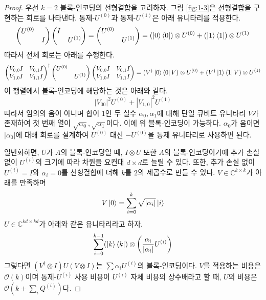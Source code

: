 \documentclass[a4paper,atbegshi,chapter,]{oblivoir}
\begin{document}
\begin{proof}
  우선 $k=2$ 블록-인코딩의 선형결합을 고려하자. 그림 \ref{fig:1-3}은 선형결합을
  구현하는 회로를 나타낸다. 통제-$U^{(0)}$과 통제-$U^{(1)}$은 아래 유니타리를
  적용한다.
  \begin{equation}
    \begin{pmatrix}U^{(0)}&\\&I\end{pmatrix}
    \begin{pmatrix}I&\\&U^{(1)}\end{pmatrix}=
    \begin{pmatrix}U^{(0)}&\\&U^{(1)}\end{pmatrix}=
    (\ket0\bra0)\otimes U^{(0)}+(\ket1\bra1)\otimes U^{(1)}
  \end{equation}
  따라서 전체 회로는 아래를 수행한다.
  \begin{equation}
    \begin{pmatrix}V_{0,0}I&V_{0,1}I\\V_{1,0}I&V_{1,1}I\end{pmatrix}^{\dagger}
    \begin{pmatrix}U^{(0)}&\\&U^{(1)}\end{pmatrix}
    \begin{pmatrix}V_{0,0}I&V_{0,1}I\\V_{1,0}I&V_{1,1}I\end{pmatrix}=
    (V^{\dagger}\ket0\bra0V)\otimes U^{(0)}+(V^{\dagger}\ket1\bra1V)\otimes
    U^{(1)}
  \end{equation}
  이 행렬에서 블록-인코딩에 해당하는 것은 아래와 같다.
  \begin{equation}
    |V_{00}|^2U^{(0)}+|V_{1,0}|^2 U^{(1)}
  \end{equation}
  따라서 임의의 음이 아니며 합이 $1$인 두 실수 $\alpha_0,\alpha_1$에 대해
  단일 큐비트 유니타리 $V$가 존재하여 첫 번째 열이 $\sqrt{\alpha_0},
  \sqrt{\alpha_1}$이다. 이에 위 블록-인코딩이 가능하다. $\alpha_0$가 음이면
  $|\alpha_0|$에 대해 회로를 설계하여 $U^{(0)}$ 대신 $-U^{(0)}$을 통제
  유니타리로 사용하면 된다.

  일반화하면, $U$가 $A$의 블록-인코딩일 때, $I\otimes U$ 또한 $A$의
  블록-인코딩이기에 추가 손실 없이 $U^{(i)}$의 크기에 따라 차원을 요컨대
  $d\times d$로 
  늘릴 수 있다. 또한, 추가 손실 없이 $U^{(i)}=I$와 $\alpha_i=0$를
  선형결합에 더해 $k$를 $2$의 제곱수로 만들 수 있다. 
  $V\in\mathbb{C}^{k\times k}$가 아래를 만족하며
  \[
    V\ket0 = \sum_{i=0}^k\sqrt{|\alpha_i|}\ket{i}
  \]
  $U\in\mathbb{C}^{kd\times kd}$가 아래와 같은 유니타리라고 하자.
  \[
    \sum_{i=0}^{k-1}(\ket{k}\bra{k})\otimes\left(\frac{\alpha_i}{|\alpha_i|}
    U^{(i)}\right)
  \]
  그렇다면 $(V^{\dagger}\otimes I)U(V\otimes I)$는 $\sum \alpha_i U^{(i)}$의
  블록-인코딩이다. $V$를 적용하는 비용은 $\mathcal{O}(k)$이며
  통제-$U^{(i)}$ 사용 비용이 $U^{(i)}$ 자체 비용의 상수배라고 할 때, 
  $U$의 비용은 $\mathcal{O}(k+\sum_i Q^{(i)})$다. 
\end{proof}
\end{document}
